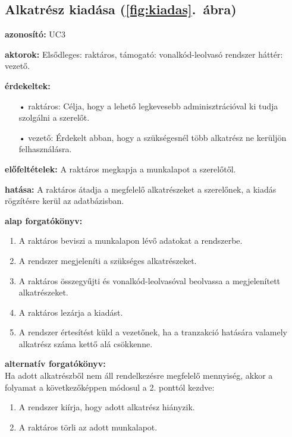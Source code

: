 \documentclass[12pt]{article}\usepackage[left=20mm,right=20mm,top=14mm,bottom=20mm]{geometry}
\begin{document}
\subsection{Alkatrész kiadása (\ref{fig:kiadas}.~ábra)}
\noindent\textbf{azonosító: } UC3
\vspace{4mm}

\noindent\textbf{aktorok: } Elsődleges: raktáros, támogató: vonalkód-leolvasó rendszer háttér: vezető.
\vspace{4mm}

\noindent\textbf{érdekeltek: }
\vspace*{-3mm}
\begin{itemize}
\item[•] raktáros: Célja, hogy a lehető legkevesebb adminisztrációval ki tudja szolgálni a szerelőt.
\item[•] vezető: Érdekelt abban, hogy a szükségesnél több alkatrész ne kerüljön felhasználásra.
\end{itemize}
\vspace{4mm}

\noindent\textbf{előfeltételek: } A raktáros megkapja a munkalapot a szerelőtől.
\vspace{4mm}

\noindent\textbf{hatása: } A raktáros átadja a megfelelő alkatrészeket a szerelőnek, a kiadás rögzítésre kerül az adatbázisban.
\vspace{4mm}

\noindent\textbf{alap forgatókönyv: }
\begin{enumerate}
\item A raktáros beviszi a munkalapon lévő adatokat a rendszerbe.
\item A rendszer megjeleníti a szükséges alkatrészeket.
\item A raktáros összegyűjti és vonalkód-leolvasóval beolvassa a megjelenített alkatrészeket.
\item A raktáros lezárja a kiadást.
\item A rendszer értesítést küld a vezetőnek, ha a tranzakció hatására valamely alkatrész száma kettő alá csökkenne.
\end{enumerate}
\vspace{4mm}

\noindent\textbf{alternatív forgatókönyv:} \\
Ha adott alkatrészből nem áll rendelkezésre megfelelő mennyiség, akkor a folyamat a következőképpen módosul a 2. ponttól kezdve:
\begin{enumerate}
\item A rendszer kiírja, hogy adott alkatrész hiányzik.
\item A raktáros törli az adott munkalapot.
\end{enumerate}
\end{document}
